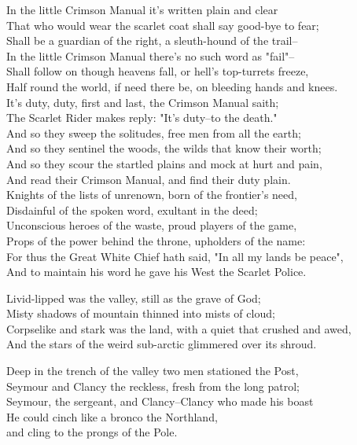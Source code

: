 
\begin{poemblock}
 In the little Crimson Manual it's written plain and clear\\
 That who would wear the scarlet coat shall say good-bye to fear;\\
 Shall be a guardian of the right, a sleuth-hound of the trail--\\
 In the little Crimson Manual there's no such word as "fail"--\\
 Shall follow on though heavens fall, or hell's top-turrets freeze,\\
 Half round the world, if need there be, on bleeding hands and knees.\\
 It's duty, duty, first and last, the Crimson Manual saith;\\
 The Scarlet Rider makes reply: "It's duty--to the death."\\
 And so they sweep the solitudes, free men from all the earth;\\
 And so they sentinel the woods, the wilds that know their worth;\\
 And so they scour the startled plains and mock at hurt and pain,\\
 And read their Crimson Manual, and find their duty plain.\\
 Knights of the lists of unrenown, born of the frontier's need,\\
 Disdainful of the spoken word, exultant in the deed;\\
 Unconscious heroes of the waste, proud players of the game,\\
 Props of the power behind the throne, upholders of the name:\\
 For thus the Great White Chief hath said, "In all my lands be peace",\\
 And to maintain his word he gave his West the Scarlet Police.

 Livid-lipped was the valley, still as the grave of God;\\
\idt Misty shadows of mountain thinned into mists of cloud;\\
 Corpselike and stark was the land, with a quiet that crushed and awed,\\
\idt And the stars of the weird sub-arctic glimmered over its shroud.

 Deep in the trench of the valley two men stationed the Post,\\
\idt Seymour and Clancy the reckless, fresh from the long patrol;\\
 Seymour, the sergeant, and Clancy--Clancy who made his boast\\
\idt He could cinch like a bronco the Northland,\\
and cling to the prongs of the Pole.


\end{poemblock}
